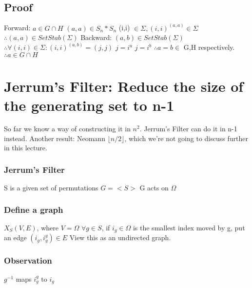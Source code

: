 \subsection{Proof}
Forward:\newline
	$a \in G \cap H$\newline
	$(a,a) \in S_n*S_n$\newline
	(i,i) $\in \Sigma, (i,i)^{(a,a) } \in \Sigma$\newline
	$\therefore (a,a) \in SetStab(\Sigma)$\newline\newline
Backward:\newline
	$(a,b) \in SetStab(\Sigma)$\newline
	$\therefore \forall (i,i) \in \Sigma:(i,i)^{(a,b)}=(j,j)$\newline
	$j=i^a$\newline
	$j=i^b$\newline
	$\therefore a=b \in$ G,H respectively.\newline
	$\therefore a \in G \cap H$\newline


\section{Jerrum's Filter: Reduce the size of the generating set to n-1}
So far we know a way of constructing it in $n^2$. Jerrum's Filter can do it in n-1 instead.
Another result: Neomann $ \lfloor n/2 \rfloor $, which we're not going to discuss further in this lecture.

\subsubsection{Jerrum's Filter}
S is a given set of permutations\newline
$G = <S>$\newline
G acts on $\Omega$

\subsubsection{Define a graph}
$X_S (V,E)$, where $V=\Omega$\newline
$\forall g \in S$, if $i_g \in \Omega$  is the smallest index moved by g, put an edge $(i_g,i_g^g ) \in E$\newline
View this as an undirected graph.

\subsubsection{Observation}
$g^{-1}$  maps $i_g^g$  to $i_g$

